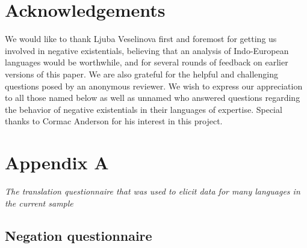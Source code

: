 \documentclass[output=paper]{langsci/langscibook}
\begin{document}
\nocite{Schmitt1991}
\nocite{Shaked1979}
\nocite{Vahman1988}
\nocite{Williams1990}
{\sloppy
\printbibliography[heading=subbibliography,keyword=source,title={Sources}]
}

\section*{Acknowledgements}

We would like to thank Ljuba Veselinova first and foremost for getting us involved in negative existentials, believing that an analysis of Indo-European languages would be worthwhile, and for several rounds of feedback on earlier versions of this paper. We are also grateful for the helpful and challenging questions posed by an anonymous reviewer. We wish to express our appreciation to all those named below as well as unnamed who answered questions regarding the behavior of negative existentials in their languages of expertise. Special thanks to Cormac Anderson for his interest in this project.

\section*{Appendix A}

\textit{The translation questionnaire that was used to elicit data for many
languages in the current sample}

\subsection*{Negation questionnaire}
\end{document}

